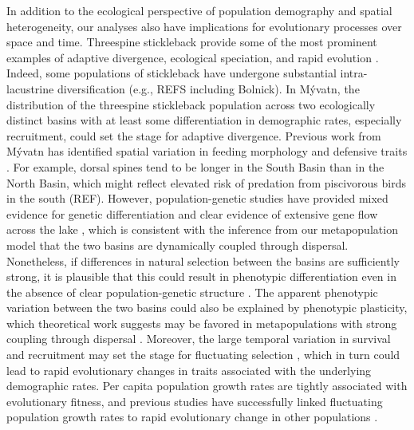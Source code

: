 \documentclass[11pt]{article}
\begin{document}
In addition to the ecological perspective 
of population demography and spatial heterogeneity, 
our analyses also have implications for evolutionary processes over space and time. 
Threespine stickleback provide some of the most prominent examples of adaptive divergence, 
ecological speciation, and rapid evolution \citep[reviewed in][]{hendry2013stickleback}. 
Indeed, some populations of stickleback 
have undergone substantial intra-lacustrine diversification (e.g., REFS including Bolnick). 
In M\'{y}vatn, the distribution of the threespine stickleback population across 
two ecologically distinct basins with at least some differentiation in demographic rates, 
especially recruitment, could set the stage for adaptive divergence. 
Previous work from M\'{y}vatn has identified spatial variation 
in feeding morphology and defensive traits \citep{millet2013}. 
For example, dorsal spines tend to be longer in the South Basin than in the North Basin,
which might reflect elevated risk of predation from piscivorous birds in the south (REF). 
However, population-genetic studies have provided mixed evidence 
for genetic differentiation and clear evidence of extensive gene flow 
across the lake \citep{olafsdottir2007postglacial, millet2013}, 
which is consistent with the inference from our metapopulation model that the two basins 
are dynamically coupled through dispersal. 
Nonetheless, if differences in natural selection between the basins are sufficiently strong, 
it is plausible that this could result in phenotypic differentiation 
even in the absence of clear population-genetic structure 
\citep{rasanen2008disentangling}. 
The apparent phenotypic variation between the two basins 
could also be explained by phenotypic plasticity, 
which theoretical work suggests may be favored in metapopulations 
with strong coupling through dispersal \citep{sultan2002metapopulation}. 
Moreover, the large temporal variation in survival and recruitment may set the stage 
for fluctuating selection \citep{siepielski2009s}, 
which in turn could lead to rapid evolutionary changes in traits associated 
with the underlying demographic rates. 
Per capita population growth rates are tightly associated with evolutionary fitness, 
and previous studies have successfully linked fluctuating population growth rates 
to rapid evolutionary change in other populations 
\citep{coulson2008dynamics, engen2014estimating, de2019stage}.
\end{document}
